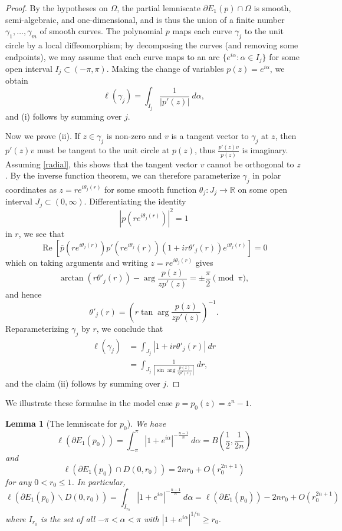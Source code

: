 \documentclass[12pt]{amsart}
\newtheorem{lemma}{Lemma}[section]
\newcommand{\R}{\mathbb{R}}
\renewcommand{\arg}{\operatorname{arg}}
\renewcommand{\Re}{\operatorname{Re}}
\begin{document}
\begin{proof} By the hypotheses on $\Omega$, the partial lemniscate $\partial E_1(p) \cap \Omega$ is smooth, semi-algebraic, and one-dimensional, and is thus the union of a finite number $\gamma_1,\dots,\gamma_m$ of smooth curves.  The polynomial $p$ maps each curve $\gamma_j$ to the unit circle by a local diffeomorphism; by decomposing the curves (and removing some endpoints), we may assume that each curve maps to an arc $\{ e^{i\alpha}: \alpha \in I_j \}$ for some open interval $I_j \subset (-\pi,\pi)$.  Making the change of variables $p(z) = e^{i\alpha}$, we obtain
$$ \ell(\gamma_j) = \int_{I_j} \frac{1}{|p'(z)|}\ d\alpha,$$
and (i) follows by summing over $j$.

Now we prove (ii). If $z \in \gamma_j$ is non-zero and $v$ is a tangent vector to $\gamma_j$ at $z$, then $p'(z) v$ must be tangent to the unit circle at $p(z)$, thus $\frac{p'(z) v}{p(z)}$ is imaginary.  Assuming \eqref{radial}, this shows that the tangent vector $v$ cannot be orthogonal to $z$.  By the inverse function theorem, we can therefore parameterize $\gamma_j$ in polar coordinates as $z = r e^{i\theta_j(r)}$ for some smooth function $\theta_j \colon J_j \to \R$ on some open interval $J_j \subset (0,\infty)$.  Differentiating the identity
$$ |p(r e^{i\theta_j(r)})|^2 = 1$$
in $r$, we see that
$$ \Re\left[ \overline{p}(re^{i\theta_j(r)}) p'(re^{i\theta_j}(r)) (1 + i r \theta'_j(r)) e^{i\theta_j(r)} \right] = 0$$
which on taking arguments and writing $z = re^{i\theta_j(r)}$ gives
$$ \arctan(r \theta'_j(r)) - \arg \frac{p(z)}{z p'(z)} = \pm \frac{\pi}{2} \pmod{\pi},$$
and hence
$$ \theta'_j(r) = \left(r \tan \arg \frac{p(z)}{z p'(z)}\right)^{-1}.$$
Reparameterizing $\gamma_j$ by $r$, we conclude that
\begin{align*}
     \ell(\gamma_j) &= \int_{J_j} |1 + ir \theta'_j(r)|\ dr\\
     &= \int_{J_j} \frac{1}{\left|\sin \arg \frac{p(z)}{z p'(z)}\right|} \ dr,
\end{align*}
and the claim (ii) follows by summing over $j$.
\end{proof}

We illustrate these formulae in the model case $p=p_0(z) = z^n - 1$.

\begin{lemma}[The lemniscate for $p_0$]\label{out}  We have
\begin{equation}\label{lbo-ident}
 \ell(\partial E_1(p_0)) = \int_{-\pi}^\pi |1+e^{i\alpha}|^{-\frac{n-1}{n}}\ d\alpha = B\left(\frac{1}{2},\frac{1}{2n}\right)
\end{equation}
and
\begin{equation}\label{lbo-in} \ell(\partial E_1(p_0) \cap D(0,r_0)) = 2nr_0 + O(r_0^{2n+1})
\end{equation}
for any $0 < r_0 \leq 1$.  In particular,
\begin{equation}\label{lout}
    \ell(\partial E_1(p_0) \backslash D(0,r_0)) = \int_{I_{r_0}} |1 + e^{i\alpha}|^{-\frac{n-1}{n}} \ d\alpha = \ell(\partial E_1(p_0)) - 2nr_0 + O( r_0^{2n+1})
\end{equation}
where $I_{r_0}$ is the set of all $-\pi < \alpha < \pi$ with $|1+e^{i\alpha}|^{1/n} \geq r_0$.
\end{lemma}
\end{document}
